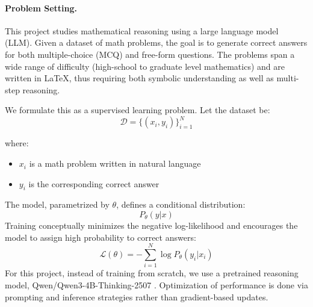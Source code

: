 \documentclass{article}
\begin{document}
\paragraph{Problem Setting.}


This project studies mathematical reasoning using a large language model (LLM). Given a dataset of math problems, the goal is to generate correct answers for both multiple-choice (MCQ) and free-form questions. The problems span a wide range of difficulty (high-school to graduate level mathematics) and are written in LaTeX, thus requiring both symbolic understanding as well as multi-step reasoning.


We formulate this as a supervised learning problem. Let the dataset be:
\[\mathcal{D} = \{(x_i, y_i)\}_{i=1}^N\]

where:
\begin{itemize}
    \item $x_i$ is a math problem written in natural language
    \item $y_i$ is the corresponding correct answer
\end{itemize}

The model, parametrized by $\theta$,  defines a conditional distribution:
\[P_\theta(y|x)\]
Training conceptually minimizes the negative log-likelihood and encourages the model to assign high probability to correct answers:
\[\mathcal{L}(\theta) = - \sum_{i=1}^{N}\log P_\theta(y_i | x_i)\]
For this project, instead of training from scratch, we use a pretrained reasoning model, Qwen/Qwen3-4B-Thinking-2507 \cite{qwen3}. Optimization of performance is done via prompting and inference strategies rather than gradient-based updates.
\end{document}
